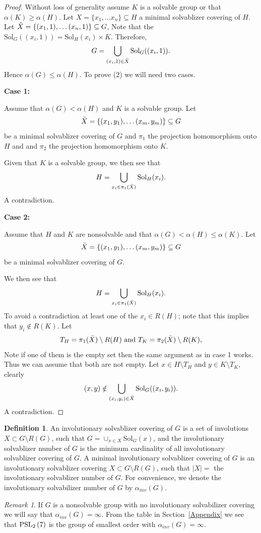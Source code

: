 \documentclass{amsart}
\newcommand{\Solv}{\text{Sol}}
\theoremstyle{definition}
\newtheorem{definition}[theorem]{Definition}
\theoremstyle{remark}
\newtheorem{remark}[theorem]{Remark}
\begin{document}
\begin{proof} 
    Without loss of generality assume $K$ is a solvable group or that $\alpha(K)\ge\alpha(H)$. Let $X=\{ x_1,\dots x_n\}\subseteq H$ a minimal solvablizer covering of $H$. Let  $\Hat{X}=\{ (x_1,1),\dots (x_n,1)\}\subseteq G$, Note that the $\Solv_G((x_i,1))=\Solv_H(x_i)\times K$. Therefore, $$G=\bigcup_{(x_i,1)\in\Hat{X}}\Solv_G((x_i,1)).$$ Hence $\alpha(G)\le\alpha(H)$.
    To prove (2) we will need two cases.
    
    {\bf Case 1:}
    
    Assume that $\alpha(G)<\alpha(H)$ and $K$ is a solvable group. Let $$\Bar{X}=\{ (x_1,y_1),\dots (x_m,y_m)\}\subseteq G $$ be a minimal solvablizer covering of $G$ and $\pi_1$ the projection homomorphism onto $H$ and and $\pi_2$ the projection homomorphism onto $K$. 

       Given that $K$ is a solvable group, we then see that 
    $$H=\bigcup_{x_i\in\pi_1(\Bar{X})}\Solv_H(x_i).$$ A contradiction.

 {\bf Case 2:}
    
    Assume that $H$ and $K$ are nonsolvable and that $\alpha(G)<\alpha(H)\le \alpha(K)$. Let $$\Bar{X}=\{ (x_1,y_1),\dots (x_m,y_m)\}\subseteq G $$ be a minimal solvablizer covering of $G$. 

       We then see that 
    $$H=\bigcup_{x_i\in\pi_1(\Bar{X})}\Solv_H(x_i).$$ To avoid a contradiction  at least one of the $x_i\in R(H)$; note that this implies that $y_i\notin R(K)$.
 Let $$T_H=\pi_1(\Bar{X})\setminus R(H)\text{\ and\ }T_K=\pi_2(\Bar{X})\setminus R(K),$$ Note if one of them is the empty set then the same argument as in case 1 works. Thus we can assume that both are not empty. Let $x\in H\setminus T_H$ and $y\in K\setminus T_K$, clearly $$(x,y)\notin \bigcup_{(x_i,y_i)\in\Bar{X}}\Solv_G((x_i,y_i)).$$ A contradiction.
    \end{proof}

 \begin{definition} An involutionary solvablizer covering of $G$ is a set of involutions $X\subset G \setminus R(G)$, such that $G=\cup_{x\in X}\Solv_G(x)$, and the involutionary solvablizer number of $G$ is the minimum cardinality of all involutionary solvablizer covering of $G$.
	A minimal involutionary solvablizer covering of $G$ is an involutionary solvablizer covering $X\subset G\setminus R(G)$, such that $\mid X\mid=$  the involutionary solvablizer number of $G$. For convenience, we denote the involutionary solvabilizer number of $G$ by $\alpha_{inv}(G)$.
\end{definition} 
\begin{remark}
    If $G$ is a nonsolvable group with no involutionary solvabilizer covering we will say that $\alpha_{inv}(G)=\infty$. From the table in Section~\ref{Appendix} we see that $\operatorname{PSL}_{2}\left(7\right)$ is the group of smallest order with $\alpha_{inv}(G)=\infty$.
\end{remark}
\end{document}
